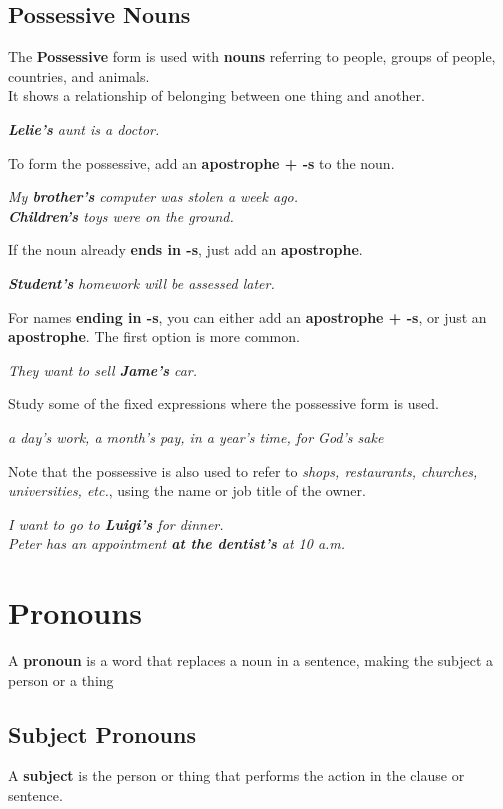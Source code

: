 \documentclass[10pt,a4paper]{article}
\begin{document}
\subsection{Possessive Nouns}
The \textbf{Possessive} form is used with \textbf{nouns} referring to people, groups of people, countries, and animals.\\
It shows a relationship of belonging between one thing and another.
\begin{center}
		\textit{ \textbf{Lelie's} aunt is a doctor.}
\end{center}
To form the possessive, add an \textbf{apostrophe + -s} to the noun.
\begin{center}
\textit{My \textbf{brother's} computer was stolen a week ago.\\
		\textbf{Children's} toys were on the ground.\\}
\end{center}
If the noun already \textbf{ends in -s}, just add an \textbf{apostrophe}.
\begin{center}
\textit{ \textbf{Student's} homework will be assessed later.}
\end{center}
For names \textbf{ending in -s}, you can either add an \textbf{apostrophe + -s}, or just an \textbf{apostrophe}. The first option is more common.
\begin{center}
\textit{They want to sell \textbf{Jame's }car.}
\end{center}
Study some of the fixed expressions where the possessive form is used.
\begin{center}
\textit{a day's work, a month's pay, in a year's time, for God's sake}
\end{center}
Note that the possessive is also used to refer to \textit{shops, restaurants, churches, universities, etc.}, using the name or job title of the owner.
\begin{center}
\textit{
		I want to go to \textbf{Luigi's} for dinner.\\
		Peter has an appointment \textbf{at the dentist's} at 10 a.m.
}
\end{center}
\newpage
\section{Pronouns}
A \textbf{pronoun} is a word that replaces a noun in a sentence, making the subject a person or a thing
\subsection{Subject Pronouns}
A \textbf{subject} is the person or thing that performs the action in the clause or sentence.
\end{document}
